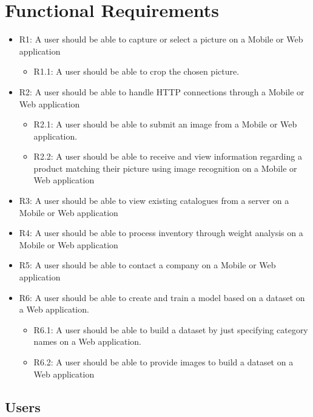 \documentclass[a4paper, 11pt]{article}
\begin{document}
\section{Functional Requirements}
\begin{itemize}
    \item R1: A user should be able to capture or select a picture on a Mobile or Web application
    \begin{itemize}
        \item R1.1: A user should be able to crop the chosen picture.
    \end{itemize}
    \item R2: A user should be able to handle HTTP connections through a Mobile or Web application
    \begin{itemize}
        \item R2.1: A user should be able to submit an image from a Mobile or Web application.
        \item R2.2: A user should be able to receive and view information regarding a product matching their picture using image recognition on a Mobile or Web application
    \end{itemize}
    \item R3: A user should be able to view existing catalogues from a server on a Mobile or Web application
    \item R4: A user should be able to process inventory through weight analysis on a Mobile or Web application
    \item R5: A user should be able to contact a company on a Mobile or Web application
    \item R6: A user should be able to create and train a model based on a dataset on a Web application.
    \begin{itemize}
        \item R6.1: A user should be able to build a dataset by just specifying category names on a Web application.
        \item R6.2: A user should be able to provide images to build a dataset on a Web application
    \end{itemize}
\end{itemize}
\subsection{Users}
\end{document}
